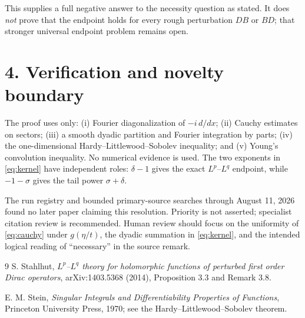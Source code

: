 \documentclass[11pt]{article}
\newcommand{\1}{\mathbf 1}
\begin{document}
This supplies a full negative answer to the necessity question as stated.
It does \emph{not} prove that the endpoint holds for every rough perturbation
$DB$ or $BD$; that stronger universal endpoint problem remains open.

\section*{4. Verification and novelty boundary}

The proof uses only: (i) Fourier diagonalization of $-i\,d/dx$;
(ii) Cauchy estimates on sectors; (iii) a smooth dyadic partition and Fourier
integration by parts; (iv) the one-dimensional Hardy--Littlewood--Sobolev
inequality; and (v) Young's convolution inequality.  No numerical evidence
is used.  The two exponents in \eqref{eq:kernel} have independent roles:
$\delta-1$ gives the exact $L^p$--$L^q$ endpoint, while $-1-\sigma$ gives
the tail power $\sigma+\delta$.

The run registry and bounded primary-source searches through August 11, 2026
found no later paper claiming this resolution.  Priority is not asserted;
specialist citation review is recommended.  Human review should focus on the
uniformity of \eqref{eq:cauchy} under $g(\eta/t)$, the dyadic summation in
\eqref{eq:kernel}, and the intended logical reading of ``necessary'' in the
source remark.

\begin{thebibliography}{9}
S. Stahlhut,
\emph{$L^p$--$L^q$ theory for holomorphic functions of perturbed first order
Dirac operators}, arXiv:1403.5368 (2014), Proposition 3.3 and Remark 3.8.

E. M. Stein,
\emph{Singular Integrals and Differentiability Properties of Functions},
Princeton University Press, 1970; see the Hardy--Littlewood--Sobolev theorem.
\end{thebibliography}
\end{document}
